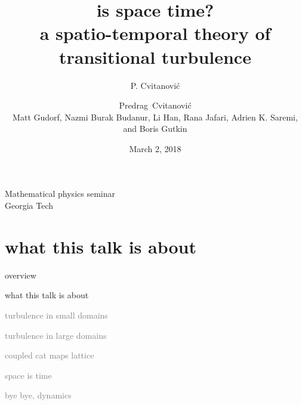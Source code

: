 



\renewcommand{\Ssym}[1]{{\ensuremath{m_{#1}}}}    %




\title{
{\huge is space time?}
    \\
{a spatio-temporal theory of transitional turbulence}
}
\author{P. Cvitanovi\'c}
\author[Cvitanovi\'c]
{
  \textcolor{green!50!black}{
  {Predrag~Cvitanovi\'c \\
  Matt Gudorf,
  Nazmi Burak Budanur,
        Li Han,
        Rana Jafari,
		Adrien K. Saremi,
  and
  Boris Gutkin
  }	%
  }
}
\institute
{
Mathematical physics seminar
\\
                Georgia Tech
 }
\date{March 2, 2018}

\begin{frame}
  \titlepage
\end{frame}


\section[what this talk is about]
 {what this talk is about}

\begin{frame}{overview}
\begin{enumerate}
              \item {\Large
what this talk is about
                  }\textcolor{gray}{\small
              \item
turbulence in small domains
              \item
turbulence in large domains
              \item
coupled cat maps lattice
              \item
space is time
              \item
bye bye, dynamics
                    }
            \end{enumerate}
\end{frame}

